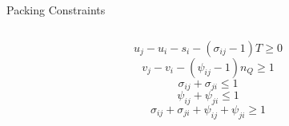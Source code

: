 \documentclass[aspectratio=169]{beamer}
\begin{document}
\begin{frame}[label={sec:orgcca17be}]{Packing Constraints}
\begin{columns}
\begin{column}{0.5\columnwidth}
\begin{equation*}
    u_j - u_i - s_i - (\sigma_{ij} - 1)T \geq 0
\end{equation*}
\begin{equation*}
    v_j - v_i - (\psi_{ij} - 1)n_Q \geq 1
\end{equation*}
\begin{equation*}
    \sigma_{ij} + \sigma_{ji} \leq 1
\end{equation*}
\begin{equation*}
    \psi_{ij} + \psi_{ji} \leq 1
\end{equation*}
\begin{equation*}
    \sigma_{ij} + \sigma_{ji} + \psi_{ij} + \psi_{ji} \geq 1
\end{equation*}
\end{column}
\end{columns}
\end{frame}
\end{document}
